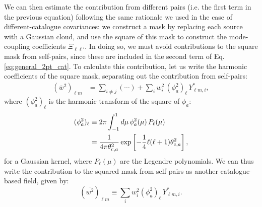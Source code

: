 \documentclass[%
 reprint,
superscriptaddress,
nofootinbib,
 amsmath,amssymb,
 aps,
 prd,
]{revtex4-2}
\newcommand{\nv}{\hat{\bf n}}
\begin{document}
    We can then estimate the contribution from different pairs (i.e. the first term in the previous equation) following the same rationale we used in the case of different-catalogue covariances: we construct a mask by replacing each source with a Gaussian cloud, and use the square of this mask to construct the mode-coupling coefficients $\Xi_{\ell\ell'}$. In doing so, we must avoid contributions to the square mask from self-pairs, since these are included in the second term of Eq. \ref{eq:general_2pt_cat}. To calculate this contribution, let us write the harmonic coefficients of the square mask, separating out the contribution from self-pairs:
    \begin{align}
      (\bar{w}^2)_{\ell m}
      &=\sum_{i\neq j}(\cdots)+\sum_i w_i^2\,(\phi^2_a)_\ell\,Y^*_{\ell m,i},
    \end{align}
    where $(\phi^2_a)_\ell$ is the harmonic transform of the square of $\phi_a$:
    \begin{align}
      (\phi^2_a)_\ell
      &\equiv 2\pi\int_{-1}^1 d\mu\,\phi^2_a(\mu)\,P_\ell(\mu)\\
      &=\frac{1}{4\pi\theta_{{\rm c},a}^2}\exp\left[-\frac{1}{4}\ell(\ell+1)\theta_{{\rm c},a}^2\right],
    \end{align}
    for a Gaussian kernel, where $P_\ell(\mu)$ are the Legendre polynomials. We can thus write the contribution to the squared mask from self-pairs as another catalogue-based field, given by:
    \begin{equation}
      (\overline{w^2})_{\ell m}\equiv \sum_i w_i^2(\phi^2_a)_\ell\,Y^*_{\ell m,i}.
    \end{equation}
\end{document}
